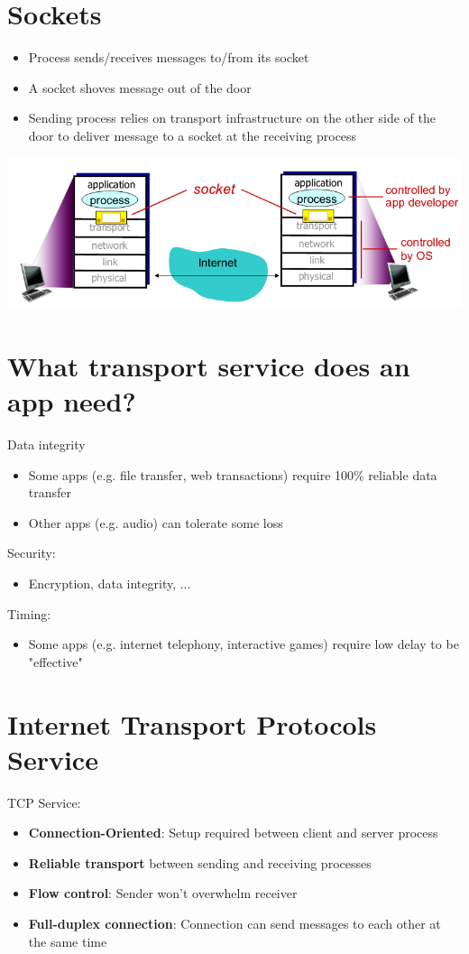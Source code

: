 \documentclass{article}[18pt]
\begin{document}
\section{Sockets}
\begin{itemize}
	\item Process sends/receives messages to/from its socket
	\item A socket shoves message out of the door
	\item Sending process relies on transport infrastructure on the other side of the door to deliver message to a socket at the receiving process
\end{itemize}
\begin{center}
	\includegraphics[scale=0.7]{sockets}
\end{center}
\section{What transport service does an app need?}
Data integrity
\begin{itemize}
	\item Some apps (e.g. file transfer, web transactions) require 100\% reliable data transfer
	\item Other apps (e.g. audio) can tolerate some loss
\end{itemize}
Security:
\begin{itemize}
	\item Encryption, data integrity, ...
\end{itemize}
Timing:
\begin{itemize}
	\item Some apps (e.g. internet telephony, interactive games) require low delay to be "effective"
\end{itemize}
\section{Internet Transport Protocols Service}

TCP Service:
\begin{itemize}
	\item \textbf{Connection-Oriented}: Setup required between client and server process
	\item \textbf{Reliable transport} between sending and receiving processes
	\item \textbf{Flow control}: Sender won't overwhelm receiver
	\item \textbf{Full-duplex connection}: Connection can send messages to each other at the same time
\end{itemize}
\end{document}
